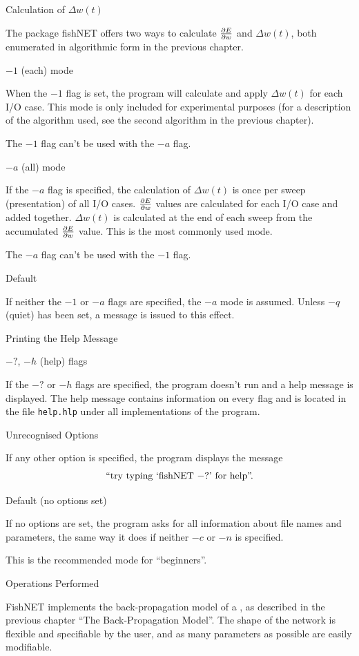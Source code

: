 \sssec Calculation of $\Delta w(t)$

The package fishNET offers two ways to calculate $\partial E \over
\partial w$ and $\Delta w(t)$, both enumerated in algorithmic form
in the previous chapter.

\ssssec $-1$ (each) mode

When the $-1$ flag is set, the program will calculate and apply
$\Delta w(t)$ for each I/O case.
This mode is only included for experimental purposes (for a
description of the algorithm used, see the second algorithm in the
previous chapter).

The $-1$ flag can't be used with the $-a$ flag.

\ssssec $-a$ (all) mode

If the $-a$ flag is specified, the calculation of $\Delta w(t)$ is
once per sweep (presentation) of all I/O cases.
$\partial E \over \partial w$ values are calculated for each I/O
case and added together.
$\Delta w(t)$ is calculated at the end of each sweep from the
accumulated $\partial E \over \partial w$ value.
This is the most commonly used mode.

The $-a$ flag can't be used with the $-1$ flag.

\ssssec Default

If neither the $-1$ or $-a$ flags are specified, the $-a$ mode is
assumed.
Unless $-q$ (quiet) has been set, a message is issued to this
effect.

\sssec Printing the Help Message

\ssssec $-?$, $-h$ (help) flags

If the $-?$ or $-h$ flags are specified, the program doesn't run and
a help message is displayed.
The help message contains information on every flag and is located
in the file {\tt help.hlp} under all implementations of the program.

\sssec Unrecognised Options

If any other option is specified, the program displays the message 
$$
\hbox{``try typing `fishNET $-?$' for help''.}
$$

\sssec Default (no options set)

If no options are set, the program asks for all information about
file names and parameters, the same way it does if neither $-c$ or
$-n$ is specified.

This is the recommended mode for ``beginners''.

\sec Operations Performed

FishNET implements the back-propagation model of a
\nn, as described in the previous chapter ``The Back-Propagation
Model''.
The shape of the network is flexible and specifiable by the user,
and as many parameters as possible are easily modifiable.

